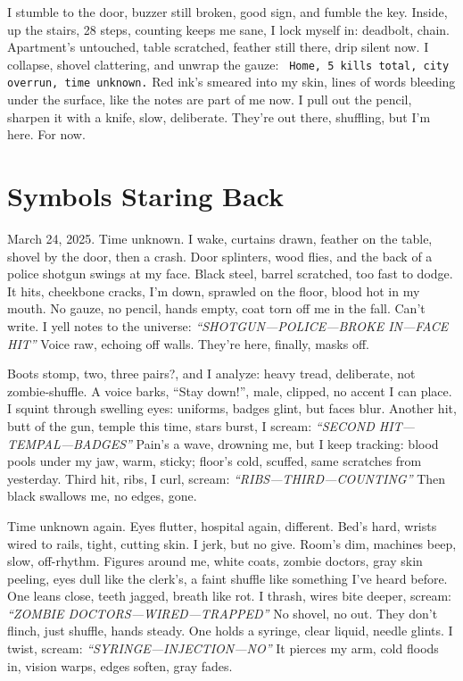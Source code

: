 \documentclass[12pt]{article} %
\newcommand{\note}[1]{\texttt{\small \color{DarkGray} #1}}
\begin{document}
I stumble to the door, buzzer still broken, good sign, and fumble the key. Inside, up the stairs, 28 steps, counting keeps me sane, I lock myself in: deadbolt, chain. Apartment’s untouched, table scratched, feather still there, drip silent now. I collapse, shovel clattering, and unwrap the gauze: \note{Home, 5 kills total, city overrun, time unknown.} Red ink’s smeared into my skin, lines of words bleeding under the surface, like the notes are part of me now. I pull out the pencil, sharpen it with a knife, slow, deliberate. They’re out there, shuffling, but I’m here. For now.

\section{Symbols Staring Back}

March 24, 2025. Time unknown. I wake, curtains drawn, feather on the table, shovel by the door, then a crash. Door splinters, wood flies, and the back of a police shotgun swings at my face. Black steel, barrel scratched, too fast to dodge. It hits, cheekbone cracks, I’m down, sprawled on the floor, blood hot in my mouth. No gauze, no pencil, hands empty, coat torn off me in the fall. Can’t write. I yell notes to the universe: \textit{“SHOTGUN—POLICE—BROKE IN—FACE HIT”} Voice raw, echoing off walls. They’re here, finally, masks off.

Boots stomp, two, three pairs?, and I analyze: heavy tread, deliberate, not zombie-shuffle. A voice barks, “Stay down!”, male, clipped, no accent I can place. I squint through swelling eyes: uniforms, badges glint, but faces blur. Another hit, butt of the gun, temple this time, stars burst, I scream: \textit{“SECOND HIT—TEMPAL—BADGES”} Pain’s a wave, drowning me, but I keep tracking: blood pools under my jaw, warm, sticky; floor’s cold, scuffed, same scratches from yesterday. Third hit, ribs, I curl, scream: \textit{“RIBS—THIRD—COUNTING”} Then black swallows me, no edges, gone.

Time unknown again. Eyes flutter, hospital again, different. Bed’s hard, wrists wired to rails, tight, cutting skin. I jerk, but no give. Room’s dim, machines beep, slow, off-rhythm. Figures around me, white coats, zombie doctors, gray skin peeling, eyes dull like the clerk’s, a faint shuffle like something I’ve heard before. One leans close, teeth jagged, breath like rot. I thrash, wires bite deeper, scream: \textit{“ZOMBIE DOCTORS—WIRED—TRAPPED”} No shovel, no out. They don’t flinch, just shuffle, hands steady. One holds a syringe, clear liquid, needle glints. I twist, scream: \textit{“SYRINGE—INJECTION—NO”} It pierces my arm, cold floods in, vision warps, edges soften, gray fades.
\end{document}
